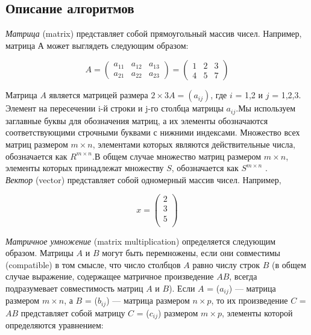 \documentclass[a4paper,12pt]{article}
\begin{document}
\subsection{Описание алгоритмов}
\textit{Матрица} (matrix) представляет собой прямоугольный массив чисел.
Например, матрица А может выглядеть следующим образом:
\begin{center}
\begin{equation}
A = \left(
\begin{array}{lll}
a_{11} & a_{12} & a_{13} \\
a_{21} & a_{22} & a_{23}
\end{array}
\right) = \left(
\begin{array}{lll}
1 & 2 & 3 \\
4 & 5 & 7
\end{array}
\right)
\end{equation}
\end{center}
Матрица $A$ является матрицей размера $2 × 3 A = (a_{ij})$, где $i$ = 1,2 и $j$ = 1,2,3. Элемент на пересечении i-й строки и j-го столбца матрицы $a_{ij}$.Мы используем заглавные буквы для обозначения матриц, а их элементы обозначаются соответствующими строчными буквами с нижними индексами. Множество всех матриц размером $m×n$, элементами которых являются действительные числа, обозначается как $R^{m×n}$.В общем случае множество матриц размером $m × n$, элементы которых принадлежат множеству $S$, обозначается как $S^{m×n}$ .\\
\textit{Вектор} (vector) представляет собой одномерный массив чисел. Например,
\begin{center}
\begin{equation}
x = \left(
\begin{matrix}
2 \\
3 \\
5 \\
\end{matrix}
\right)
\end{equation}
\end{center}
\textit{Матричное умножение} (matrix multiplication) определяется следующим образом. Матрицы $A$ и $B$ могут быть перемножены, если они совместимы (compatible) в том смысле, что число столбцов $A$ равно числу строк $B$ (в общем случае выражение, содержащее матричное произведение $AB$, всегда подразумевает совместимость матриц $A$ и $B$). Если $A$ = ($a_{ij}$) — матрица размером $m × n$, а $B$ = ($b_{ij}$) — матрица размером $n × p$, то их произведение $C$ = $AB$ представляет собой матрицу $C$ = ($c_{ij}$) размером $m × p$, элементы которой определяются уравнением:
\end{document}
